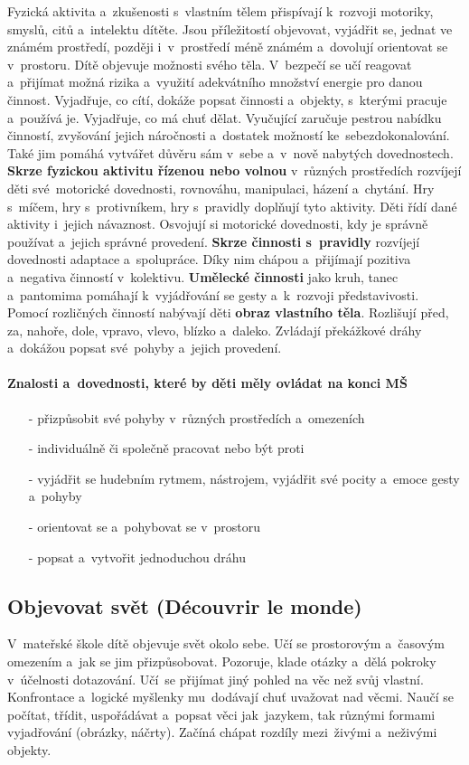 			Fyzická aktivita a~zkušenosti s vlastním tělem přispívají k rozvoji motoriky, smyslů, citů a intelektu dítěte. Jsou příležitostí objevovat, vyjádřit se, jednat ve známém prostředí, později i~v~prostředí méně známém a~dovolují orientovat se v prostoru. Dítě objevuje možnosti svého těla. V bezpečí se učí reagovat a~přijímat možná rizika a~využití adekvátního množství energie pro danou činnost. Vyjadřuje, co cítí, dokáže popsat činnosti a~objekty, s kterými pracuje a~používá je. Vyjadřuje, co má chuť dělat. Vyučující zaručuje  pestrou nabídku činností, zvyšování jejich náročnosti a~dostatek možností ke sebezdokonalování. Také jim pomáhá vytvářet důvěru sám v sebe a~v nově nabytých dovednostech. 
			\textbf{Skrze fyzickou aktivitu řízenou nebo volnou} v různých prostředích rozvíjejí děti své motorické dovednosti, rovnováhu, manipulaci, házení a~chytání. Hry s míčem, hry s protivníkem, hry s pravidly doplňují tyto aktivity. Děti řídí dané aktivity i~jejich návaznost. Osvojují si motorické dovednosti, kdy je správně používat a~jejich správné provedení. 
			\textbf{Skrze činnosti s pravidly} rozvíjejí dovednosti adaptace a~spolupráce. Díky nim chápou a přijímají pozitiva a~negativa činností v kolektivu. 
			\textbf{Umělecké činnosti} jako kruh, tanec a~pantomima pomáhají k vyjádřování se gesty a~k~rozvoji představivosti.
			Pomocí rozličných činností nabývají děti \textbf{obraz vlastního těla}. Rozlišují před, za, nahoře, dole, vpravo, vlevo, blízko a~daleko. Zvládají překážkové dráhy a~dokážou popsat své pohyby a~jejich provedení.
				\paragraph{Znalosti a~dovednosti, které by děti měly ovládat na konci MŠ}

				\begin{itemize}
					\setlength\itemsep{-2mm}
					\item[-] přizpůsobit své pohyby v různých prostředích a~omezeních
					\item[-] individuálně či společně pracovat nebo být proti
					\item[-] vyjádřit se hudebním rytmem, nástrojem, vyjádřit své pocity a~emoce gesty a~pohyby
					\item[-] orientovat se a~pohybovat se v prostoru
					\item[-] popsat a~vytvořit jednoduchou dráhu
				\end{itemize}

		\subsection{Objevovat svět (Découvrir le monde)}
			V mateřské škole dítě objevuje svět okolo sebe. Učí se prostorovým a~časovým omezením a jak se jim přizpůsobovat. Pozoruje, klade otázky a~dělá pokroky v účelnosti dotazování. Učí se přijímat jiný pohled na věc než svůj vlastní.  Konfrontace a~logické myšlenky mu dodávají chuť uvažovat nad věcmi. Naučí se počítat, třídit, uspořádávat a~popsat věci jak jazykem, tak různými formami vyjadřování (obrázky, náčrty). Začíná chápat rozdíly mezi živými a~neživými objekty.

